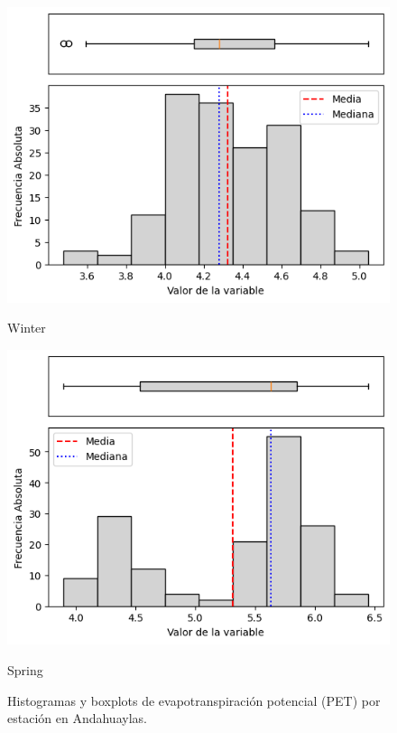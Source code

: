 \begin{figure}[H]
\begin{minipage}{0.30\textwidth}
  \includegraphics[width=\linewidth]{resultados/por_estacion_del_anio/boxplot_clases_por_estacion/Andahuaylas/PET_HistBoxplot_Winter.png}
  \caption*{Winter}
\end{minipage}
\hfill
\begin{minipage}{0.30\textwidth}
  \includegraphics[width=\linewidth]{resultados/por_estacion_del_anio/boxplot_clases_por_estacion/Andahuaylas/PET_HistBoxplot_Spring.png}
  \caption*{Spring}
\end{minipage}
\caption{Histogramas y boxplots de evapotranspiración potencial (PET) por estación en Andahuaylas.}
\label{fig:andahuaylas_pet_hist}
\end{figure}

